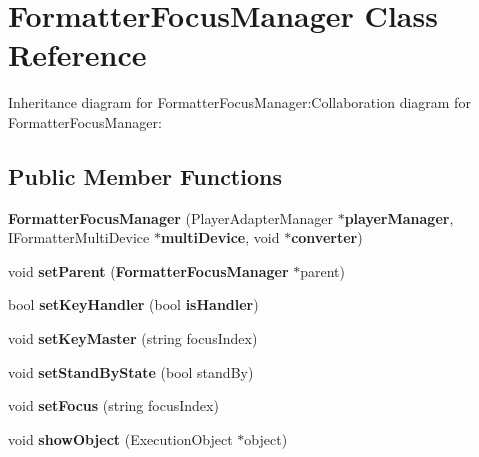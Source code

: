 \section{FormatterFocusManager Class Reference}
\label{classbr_1_1pucrio_1_1telemidia_1_1ginga_1_1ncl_1_1focus_1_1FormatterFocusManager}
Inheritance diagram for FormatterFocusManager:Collaboration diagram for FormatterFocusManager:\subsection*{Public Member Functions}
\begin{CompactItemize}
\item 
\textbf{FormatterFocusManager} (PlayerAdapterManager $\ast${\bf playerManager}, IFormatterMultiDevice $\ast${\bf multiDevice}, void $\ast${\bf converter})\label{classbr_1_1pucrio_1_1telemidia_1_1ginga_1_1ncl_1_1focus_1_1FormatterFocusManager_192e4a59409c0ad552f8c54250a784f5}

\item 
void \textbf{setParent} ({\bf FormatterFocusManager} $\ast$parent)\label{classbr_1_1pucrio_1_1telemidia_1_1ginga_1_1ncl_1_1focus_1_1FormatterFocusManager_1d60bc0796f66ad09720f65ad1f6d8fb}

\item 
bool \textbf{setKeyHandler} (bool {\bf isHandler})\label{classbr_1_1pucrio_1_1telemidia_1_1ginga_1_1ncl_1_1focus_1_1FormatterFocusManager_0e3bb20e5956653c0c0b112fb3b66a54}

\item 
void \textbf{setKeyMaster} (string focusIndex)\label{classbr_1_1pucrio_1_1telemidia_1_1ginga_1_1ncl_1_1focus_1_1FormatterFocusManager_3282aaba67da481c9a333813e56802de}

\item 
void \textbf{setStandByState} (bool standBy)\label{classbr_1_1pucrio_1_1telemidia_1_1ginga_1_1ncl_1_1focus_1_1FormatterFocusManager_ec91d5450ec8c5bd48870cb2e1f5596f}

\item 
void \textbf{setFocus} (string focusIndex)\label{classbr_1_1pucrio_1_1telemidia_1_1ginga_1_1ncl_1_1focus_1_1FormatterFocusManager_846473d08ad635ec309dd9b02e58cf42}

\item 
void \textbf{showObject} (ExecutionObject $\ast$object)\label{classbr_1_1pucrio_1_1telemidia_1_1ginga_1_1ncl_1_1focus_1_1FormatterFocusManager_633c6a1d6b767afce9c90f1e557786ad}


\end{CompactItemize}
